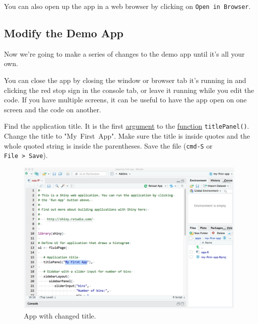 \documentclass[
  oneside]{book}
\newcommand{\AttributeTok}[1]{\textcolor[rgb]{0.77,0.63,0.00}{#1}}
\newcommand{\StringTok}[1]{\textcolor[rgb]{0.31,0.60,0.02}{#1}}
\begin{document}
\begin{info}
You can also open up the app in a web browser by clicking on \texttt{Open\ in\ Browser}.

\end{info}

\hypertarget{modify-the-demo-app}{%
\subsection{Modify the Demo App}\label{modify-the-demo-app}}

Now we're going to make a series of changes to the demo app until it's all your own.

\begin{info}
You can close the app by closing the window or browser tab it's running in and clicking the red stop sign in the console tab, or leave it running while you edit the code. If you have multiple screens, it can be useful to have the app open on one screen and the code on another.

\end{info}

Find the application title. It is the first \href{defs.html\#argument}{argument} to the \href{defs.html\#function}{function} \texttt{titlePanel}\texttt{()}. Change the \AttributeTok{title} to \StringTok{"My\ First\ App"}. Make sure the title is inside quotes and the whole quoted string is inside the parentheses. Save the file (\texttt{cmd-S} or \texttt{File\ \textgreater{}\ Save}).

\begin{figure}

{\centering \includegraphics[width=1\linewidth]{images/demo_app/06-change-title} 

}

\caption{App with changed title.}\label{fig:first-change-title}
\end{figure}
\end{document}
